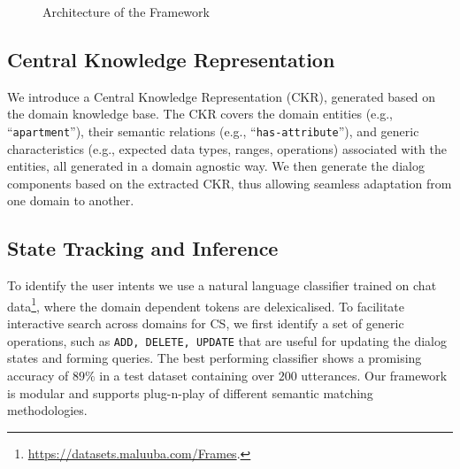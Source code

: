 \documentclass[letterpaper]{article} %
\begin{document}
\begin{figure}[!ht]
\centering
{}
\caption{Architecture of the Framework}
\label{fig:system}
\end{figure}


\subsection{Central Knowledge Representation}
We introduce a Central Knowledge Representation (CKR), generated based on the domain knowledge base.
\vspace{-0.90mm}
\vspace{-1.80mm}
\vspace{-2.70mm}
The CKR covers the domain entities (e.g., ``\texttt{apartment}''), their semantic relations (e.g., ``\texttt{has-attribute}''),
and generic characteristics (e.g., expected data types, ranges, operations) associated with the entities, all generated in a domain agnostic way. We then generate the dialog components based on the extracted CKR, thus allowing seamless adaptation from one domain to another.

\vspace{-1.52mm}
\subsection{State Tracking and Inference}
To identify the user intents we use a natural language classifier \cite{yang2016hierarchical} trained on chat data\footnote{ \url{https://datasets.maluuba.com/Frames}.}, where the domain dependent tokens are delexicalised. To facilitate interactive search across domains for CS, we first identify a set of generic operations, such as {\texttt{ADD, DELETE, UPDATE}} that are useful for updating the dialog states and forming queries.
The best performing classifier shows a promising accuracy of $89\%$ in a test dataset containing over $200$ utterances. %
Our framework is modular and supports plug-n-play of different semantic matching methodologies.
\end{document}
